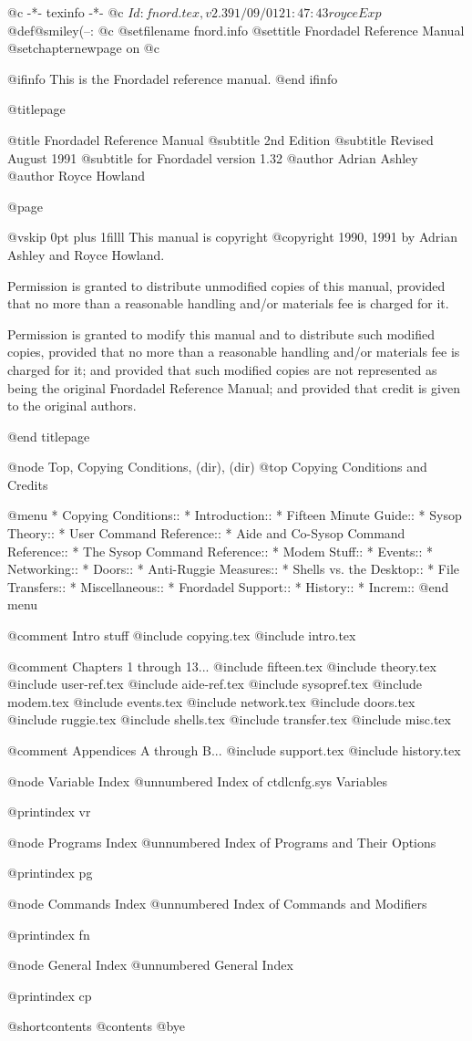    @c -*- texinfo -*-
@c $Id: fnord.tex,v 2.3 91/09/01 21:47:43 royce Exp $
@def@smiley{(--:}
@c %
@setfilename fnord.info
@settitle Fnordadel Reference Manual
@setchapternewpage on
@c %

@ifinfo
This is the Fnordadel reference manual.
@end ifinfo

@titlepage

@title Fnordadel Reference Manual
@subtitle 2nd Edition
@subtitle Revised August 1991
@subtitle for Fnordadel version 1.32
@author Adrian Ashley
@author Royce Howland

@page

@vskip 0pt plus 1filll
This manual is copyright @copyright{} 1990, 1991
by Adrian Ashley and Royce Howland.

Permission is granted to distribute unmodified copies of this manual,
provided that no more than a reasonable handling and/or materials fee is
charged for it.

Permission is granted to modify this manual and to distribute such modified
copies, provided that no more than a reasonable handling and/or materials
fee is charged for it; and provided that such modified copies are not
represented as being the original Fnordadel Reference Manual; and provided
that credit is given to the original authors.

@end titlepage

@node Top, Copying Conditions, (dir), (dir)
@top Copying Conditions and Credits

@menu
* Copying Conditions::		
* Introduction::		
* Fifteen Minute Guide::	
* Sysop Theory::		
* User Command Reference::	
* Aide and Co-Sysop Command Reference::  
* The Sysop Command Reference::	 
* Modem Stuff::			
* Events::			
* Networking::			
* Doors::			
* Anti-Ruggie Measures::	
* Shells vs. the Desktop::	
* File Transfers::		
* Miscellaneous::		
* Fnordadel Support::		
* History::			
* Increm::			
@end menu

@comment Intro stuff
@include copying.tex
@include intro.tex

@comment Chapters 1 through 13...
@include fifteen.tex
@include theory.tex
@include user-ref.tex
@include aide-ref.tex
@include sysopref.tex
@include modem.tex
@include events.tex
@include network.tex
@include doors.tex
@include ruggie.tex
@include shells.tex
@include transfer.tex
@include misc.tex

@comment Appendices A through B...
@include support.tex
@include history.tex

@node Variable Index
@unnumbered Index of ctdlcnfg.sys Variables

@printindex vr

@node Programs Index
@unnumbered Index of Programs and Their Options

@printindex pg

@node Commands Index
@unnumbered Index of Commands and Modifiers

@printindex fn

@node General Index
@unnumbered General Index

@printindex cp

@shortcontents
@contents
@bye
